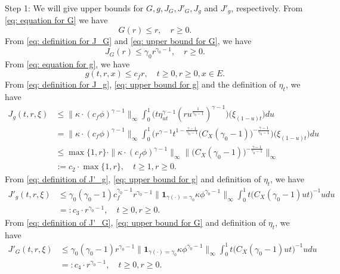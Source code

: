 \documentclass[12pt, a4paper]{amsart}
\theoremstyle{definition}
\numberwithin{equation}{section}
\begin{document}
	Step 1: We will give upper bounds for $G,g,J_G,J'_G,J_g$ and $J'_g$, respectively.
	From \eqref{eq: equation for G} we have 
\[\label{eq: upper bound for G}
	G(r) 
	\leq r,
	\quad r \geq 0.
\]	
	From \eqref{eq: definition for J_G} and \eqref{eq: upper bound for G}, we have
\[\label{eq: upper bound for J_G}
	J_G(r) 
	\leq \gamma_0 r^{\gamma_0 - 1}, 
	\quad r \geq 0.
\]
	From \eqref{eq: equation for g}, we have
\[\label{eq: upper bound for g}
	g(t,r, x) \leq c_f r, 
	\quad t\geq 0, r \geq 0, x\in E.
\]
	From \eqref{eq: definition for J_g}, \eqref{eq: upper bound for g} and the definition of $\eta_t$, we have
\[\begin{split}
	J_g(t,r, \xi) 
	&\leq \|\kappa \cdot (c_f\phi)^{\gamma - 1} \|_\infty \int_0^1 \big(  t\eta_{ut}^{\gamma - 1} (ru^{\frac{1}{\gamma_0 - 1}} )^{\gamma-1}  \big) \big(  \xi_{(1-u)t} \big) du
	\\&= \| \kappa \cdot (c_f\phi)^{\gamma - 1} \|_\infty \int_0^1 \big(  r^{\gamma - 1}t^{1-\frac{\gamma - 1}{\gamma_0 - 1}}  \big( C_X (\gamma_0 - 1) \big)^{-\frac{\gamma - 1}{\gamma_0 - 1}}  \big) \big( \xi_{(1-u)t} \big) du
	\\& \leq \max\{1,r\} \cdot \| \kappa \cdot (c_f\phi)^{\gamma - 1} \|_\infty \Big\|  \big( C_X (\gamma_0 - 1) \big)^{-\frac{\gamma - 1}{\gamma_0 - 1}}\Big\|_\infty
	\\& := c_2 \cdot \max  \{1,r\}, 
	\quad t\geq 1, r\geq 0.
\end{split}\]
	From \eqref{eq: definition of J'_g}, \eqref{eq: upper bound for g} and definition of $\eta_t$, we have
\[\begin{split}
	J'_g(t,r,\xi) 
	&\leq \gamma_0(\gamma_0 - 1) c_f^{\gamma_0 - 1}r^{\gamma_0 - 1} \|  \mathbf 1_{\gamma(\cdot) = \gamma_0}  \kappa \phi^{\gamma_0 - 1} \|_\infty \int_0^1 t \big( C_X(\gamma_0 - 1) ut \big)^{- 1}  u  du
	\\&=: c_3 \cdot r^{\gamma_0 - 1},
	\quad t\geq 0, r\geq 0.
\end{split}\]
	From \eqref{eq: definition of J'_G}, \eqref{eq: upper bound for G} and definition of $\eta_t$, we have
\[\label{eq: upper bound for J'_G} \begin{split}
	J'_G(t,r,\xi) 
	&\leq \gamma_0(\gamma_0 - 1) r^{\gamma_0 - 1} \big\|   \mathbf 1_{\gamma(\cdot) = \gamma_0}  \kappa \phi^{\gamma_0 - 1} \big\|_\infty \int_0^1 t \big(  C_X(\gamma_0 - 1) ut \big)^{- 1}  u  du
	\\&=: c_4 \cdot r^{\gamma_0 - 1},
	\quad t\geq 0, r\geq 0.
\end{split}\]
\end{document}
